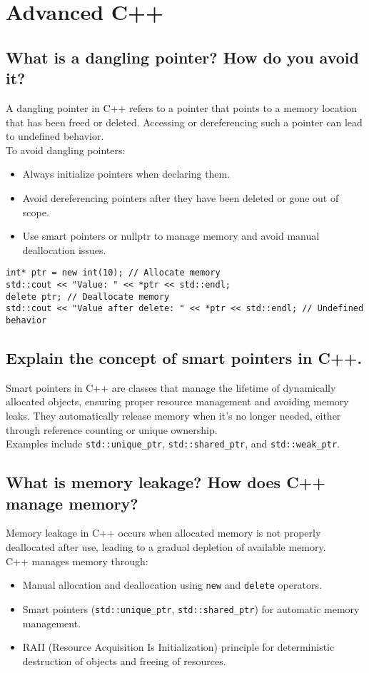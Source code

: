 \section{Advanced C++}

\subsection{What is a dangling pointer? How do you avoid it?}
A dangling pointer in C++ refers to a pointer that points to a memory location that has been freed or deleted. Accessing or dereferencing such a pointer can lead to undefined behavior. \\
To avoid dangling pointers:
\begin{itemize}
    \item Always initialize pointers when declaring them.
    \item Avoid dereferencing pointers after they have been deleted or gone out of scope.
    \item Use smart pointers or nullptr to manage memory and avoid manual deallocation issues.
\end{itemize}
\begin{tcolorbox}[title=Dangling Pointer]
\begin{verbatim}
int* ptr = new int(10); // Allocate memory
std::cout << "Value: " << *ptr << std::endl;
delete ptr; // Deallocate memory
std::cout << "Value after delete: " << *ptr << std::endl; // Undefined behavior
\end{verbatim}
\end{tcolorbox}

\subsection{Explain the concept of smart pointers in C++.}
Smart pointers in C++ are classes that manage the lifetime of dynamically allocated objects, ensuring proper resource management and avoiding memory leaks. They automatically release memory when it's no longer needed, either through reference counting or unique ownership. \\
Examples include \texttt{std::unique\_ptr}, \texttt{std::shared\_ptr}, and \texttt{std::weak\_ptr}.

\subsection{What is memory leakage? How does C++ manage memory?}
Memory leakage in C++ occurs when allocated memory is not properly deallocated after use, leading to a gradual depletion of available memory. \\
C++ manages memory through:
\begin{itemize}
    \item Manual allocation and deallocation using \texttt{new} and \texttt{delete} operators.
    \item Smart pointers (\texttt{std::unique\_ptr}, \texttt{std::shared\_ptr}) for automatic memory management.
    \item RAII (Resource Acquisition Is Initialization) principle for deterministic destruction of objects and freeing of resources.
\end{itemize}

